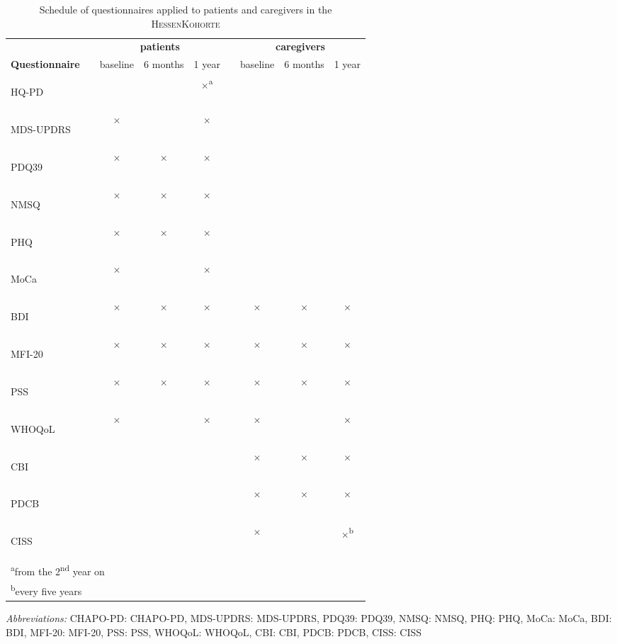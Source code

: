 \newcommand{\FC}{$\times$}
\newcommand{\FCa}{\textsuperscript{\phantom{a}}\FC{}\textsuperscript{a}}
\newcommand{\FCb}{\textsuperscript{\phantom{b}}\FC{}\textsuperscript{b}}
\newcommand{\emC}{}
\newcommand{\acb}[1]{\acs{#1}: \acl{#1}}
\newcommand{\acv}[1]{\begin{NoHyper}\acs{#1}\end{NoHyper}}
\begin{table}[H]
\begin{tabular}{lcccccccc}
\caption{Schedule of questionnaires applied to patients and caregivers in the \textsc{HessenKohorte}}
\label{tab:questionnaireSchedule}\\
\textbf{} & & \multicolumn{3}{c}{\textbf{patients}} & & \multicolumn{3}{c}{\textbf{caregivers}} \\[1em]
\textbf{Questionnaire}& & baseline & 6 months & 1 year  & & baseline   & 6 months & 1 year \\[1em]
\acv{HQ-PD}           & & \emC{}   & \emC{}   & \FCa{}  & & \emC{}     & \emC{}   & \emC{} \\
\acv{MDS-UPDRS}       & & \FC{}    & \emC{}   & \FC{}   & & \emC{}     & \emC{}   & \emC{} \\
\acv{PDQ39}           & & \FC{}    & \FC{}    & \FC{}   & & \emC{}     & \emC{}   & \emC{} \\
\acv{NMSQ}            & & \FC{}    & \FC{}    & \FC{}   & & \emC{}     & \emC{}   & \emC{} \\
\acv{PHQ}             & & \FC{}    & \FC{}    & \FC{}   & & \emC{}     & \emC{}   & \emC{} \\
\acv{MoCa}            & & \FC{}    & \emC{}   & \FC{}   & & \emC{}     & \emC{}   & \emC{} \\
\acv{BDI}             & & \FC{}    & \FC{}    & \FC{}   & & \FC{}      & \FC{}    & \FC{}  \\
\acv{MFI-20}          & & \FC{}    & \FC{}    & \FC{}   & & \FC{}      & \FC{}    & \FC{}  \\
\acv{PSS}             & & \FC{}    & \FC{}    & \FC{}   & & \FC{}      & \FC{}    & \FC{}  \\ 
\acv{WHOQoL}          & & \FC{}    & \emC{}   & \FC{}   & & \FC{}      & \emC{}   & \FC{}  \\
\acv{CBI}             & & \emC{}   & \emC{}   & \emC{}  & & \FC{}      & \FC{}    & \FC{}  \\
\acv{PDCB}            & & \emC{}   & \emC{}   & \emC{}  & & \FC{}      & \FC{}    & \FC{}  \\                              
\acv{CISS}            & & \emC{}   & \emC{}   & \emC{}  & & \FC{}      & \emC{}   & \FCb{} \\
\bottomrule
\multicolumn{9}{l}{\footnotesize{\textsuperscript{a}from the 2\textsuperscript{nd} year on}} \\
\multicolumn{9}{l}{\footnotesize{\textsuperscript{b}every five years}} \\
\end{tabular}

\bigskip
\footnotesize{\textit{Abbreviations:} \acb{CHAPO-PD}, \acb{MDS-UPDRS}, \acb{PDQ39}, \acb{NMSQ}, \acb{PHQ},
\acb{MoCa}, \acb{BDI}, \acb{MFI-20}, \acb{PSS}, \acb{WHOQoL}, \acb{CBI}, \acb{PDCB}, \acb{CISS}}
\end{table}

